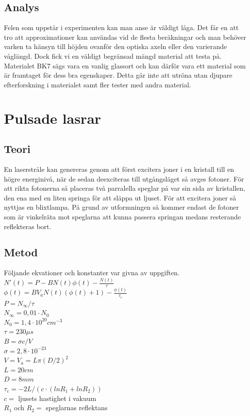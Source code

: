 \documentclass[12pt]{article}
\begin{document}
\subsection{Analys}
Felen som uppstår i experimenten kan man anse är väldigt låga. Det får en att tro att approximationer kan användas vid de flesta beräkningar och man behöver varken ta hänsyn till höjden ovanför den optiska axeln eller den varierande våglängd. Dock fick vi en väldigt begränsad mängd material att testa på. Materialet BK7 sägs vara en vanlig glassort och kan därför vara ett material som är framtaget för dess bra egenskaper. Detta går inte att utröna utan djupare efterforskning i materialet samt fler tester med andra material.


\section{Pulsade lasrar}

\subsection{Teori}

En laserstråle kan genereras genom att först excitera joner i en kristall till en högre energinivå, när de sedan deexciteras till utgångsläget så avges fotoner. För att rikta fotonerna så placeras två parralella speglar på var sin sida av kristallen, den ena med en liten springa för att släppa ut ljuset. För att excitera joner så nyttjas en blixtlampa. På grund av utformningen så kommer endast de fotoner som är vinkelräta mot speglarna att kunna passera springan medans resterande reflekteras bort.  

\subsection{Metod}
Följande ekvationer och konstanter var givna av uppgiften.\\
$N'(t)=P-BN(t)\phi(t)-\frac{N(t)}{\tau}$\\
$\phi(t)=BV_aN(t)(\phi(t)+1)-\frac{\phi(t)}{\tau_c}$\\
$P=N_\infty/\tau$\\
$N_\infty=0,01 \cdot N_0$\\
$N_0=1,4 \cdot 10^{20} cm^{-3} $\\
$\tau = 230 \mu s$\\
$B=\sigma c / V$\\
$\sigma = 2,8 \cdot 10^{-23}$\\
$V=V_a=L\pi(D/2)^2$\\
$L=20cm$\\
$D=8mm$\\
$\tau_c=-2L/(c \cdot (ln R_1 + ln R_2))$\\
$c =$ ljusets hastighet i vakuum\\
$R_1$ och $R_2 =$ speglarnas reflektans\\
\end{document}
